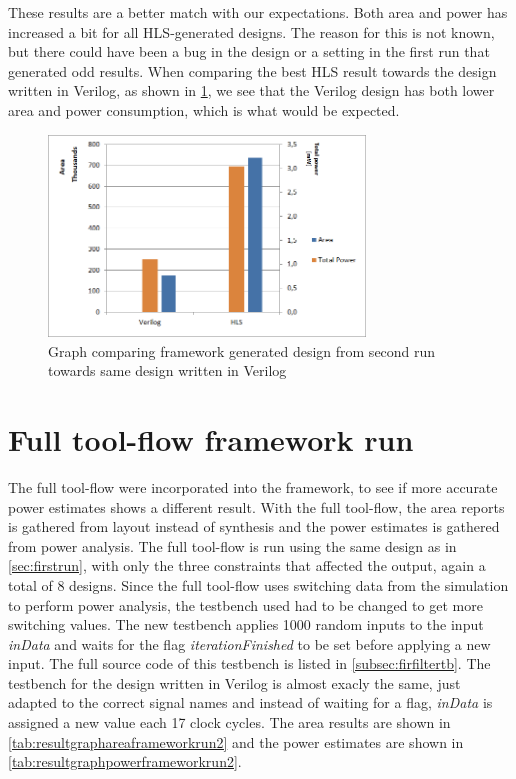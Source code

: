 These results are a better match with our expectations. Both area and power has increased a bit for all HLS-generated designs. The reason for this is not known, but there could have been a bug in the design or a setting in the first run that generated odd results. When comparing the best HLS result towards the design written in Verilog, as shown in \cref{fig:resultcomparisonhlsrun2}, we see that the Verilog design has both lower area and power consumption, which is what would be expected.

\begin{figure}[hbpt]
\centering
\includegraphics[width=0.75\textwidth]{../figs/resultComparison2.png}
\caption{\label{fig:resultcomparisonhlsrun2}Graph comparing framework generated design from second run towards same design written in Verilog}
\end{figure}

\section{Full tool-flow framework run}
The full tool-flow were incorporated into the framework, to see if more accurate power estimates shows a different result. With the full tool-flow, the area reports is gathered from layout instead of synthesis and the power estimates is gathered from power analysis. The full tool-flow is run using the same design as in \cref{sec:firstrun}, with only the three constraints that affected the output, again a total of 8 designs. Since the full tool-flow uses switching data from the simulation to perform power analysis, the testbench used had to be changed to get more switching values. The new testbench applies 1000 random inputs to the input \textit{inData} and waits for the flag \textit{iterationFinished} to be set before applying a new input. The full source code of this testbench is listed in \cref{subsec:firfiltertb}. The testbench for the design written in Verilog is almost exacly the same, just adapted to the correct signal names and instead of waiting for a flag, \textit{inData} is assigned a new value each 17 clock cycles. The area results are shown in \cref{tab:resultgraphareaframeworkrun2} and the power estimates are shown in \cref{tab:resultgraphpowerframeworkrun2}.

